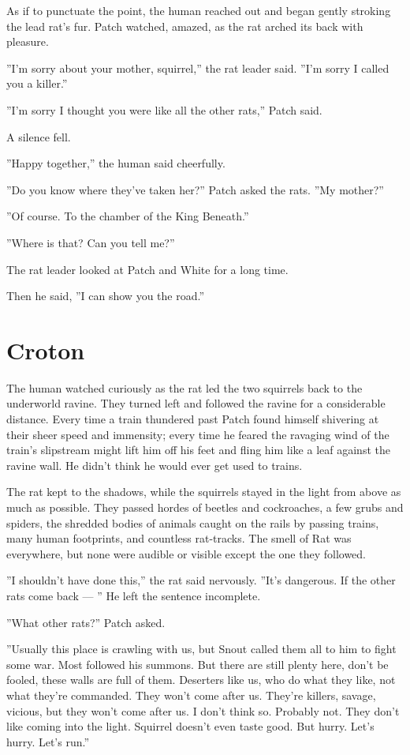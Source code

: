 \documentclass[12pt]{book}
\begin{document}
As if to punctuate the point, the human reached out and began gently stroking the lead rat's fur. Patch watched, amazed, as the rat arched its back with pleasure.

''I'm sorry about your mother, squirrel,'' the rat leader said. ''I'm sorry I called you a killer.''

''I'm sorry I thought you were like all the other rats,'' Patch said.

A silence fell.

''Happy together,'' the human said cheerfully.

''Do you know where they've taken her?'' Patch asked the rats. ''My mother?''

''Of course. To the chamber of the King Beneath.''

''Where is that? Can you tell me?''

The rat leader looked at Patch and White for a long time.

Then he said, ''I can show you the road.''


\section{Croton}

The human watched curiously as the rat led the two squirrels back to the underworld ravine. They turned left and followed the ravine for a considerable distance. Every time a train thundered past Patch found himself shivering at their sheer speed and immensity; every time he feared the ravaging wind of the train's slipstream might lift him off his feet and fling him like a leaf against the ravine wall. He didn't think he would ever get used to trains.

The rat kept to the shadows, while the squirrels stayed in the light from above as much as possible. They passed hordes of beetles and cockroaches, a few grubs and spiders, the shredded bodies of animals caught on the rails by passing trains, many human footprints, and countless rat-tracks. The smell of Rat was everywhere, but none were audible or visible except the one they followed.

''I shouldn't have done this,'' the rat said nervously. ''It's dangerous. If the other rats come back ---
'' He left the sentence incomplete.

''What other rats?'' Patch asked.

''Usually this place is crawling with us, but Snout called them all to him to fight some war. Most followed his summons. But there are still plenty here, don't be fooled, these walls are full of them. Deserters like us, who do what they like, not what they're commanded. They won't come after us. They're killers, savage, vicious, but they won't come after us. I don't think so. Probably not. They don't like coming into the light. Squirrel doesn't even taste good. But hurry. Let's hurry. Let's run.''
\end{document}
